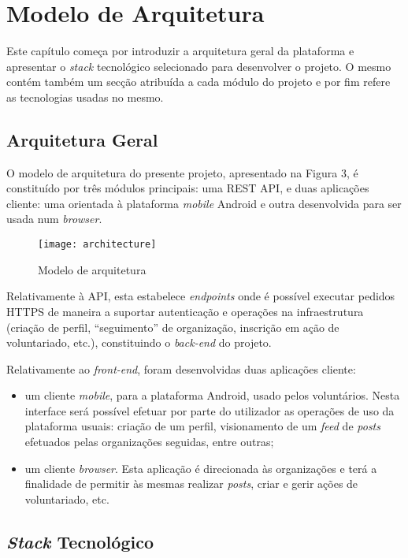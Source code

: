 \section{Modelo de Arquitetura} 
Este capítulo começa por introduzir a arquitetura geral da plataforma e apresentar o \textit{stack} tecnológico selecionado para desenvolver o projeto. O mesmo contém também um secção atribuída a cada módulo do projeto e por fim refere as tecnologias usadas no mesmo.
\par \medskip

\subsection{Arquitetura Geral}

O modelo de arquitetura do presente projeto, apresentado na Figura 3, é constituído por três módulos principais: uma REST API, e duas aplicações cliente: uma orientada à plataforma \textit{mobile} Android e outra desenvolvida para ser usada num \textit{browser}. \par \medskip

\begin{figure}[h]
	\centering
	\texttt{[image: architecture]}
	\caption{Modelo de arquitetura}
\end{figure}

Relativamente à API, esta estabelece \textit{endpoints} onde é possível executar pedidos HTTPS de maneira a suportar autenticação e operações na infraestrutura (criação de perfil, “seguimento” de organização, inscrição em ação de voluntariado, etc.), constituindo o \textit{back-end} do projeto.
\par \medskip

Relativamente ao \textit{front-end}, foram desenvolvidas duas aplicações cliente: 
\begin{itemize}
	\item um cliente \textit{mobile}, para a plataforma Android, usado pelos voluntários. Nesta interface será possível efetuar por parte do utilizador as operações de uso da plataforma usuais: criação de um perfil, visionamento de um \textit{feed} de \textit{posts} efetuados pelas organizações seguidas, entre outras;
	\item um cliente \textit{browser}. Esta aplicação é direcionada às organizações e terá a finalidade de permitir às mesmas realizar \textit{posts}, criar e gerir ações de voluntariado, etc.
\end{itemize}

\subsection{\textit{Stack} Tecnológico}


